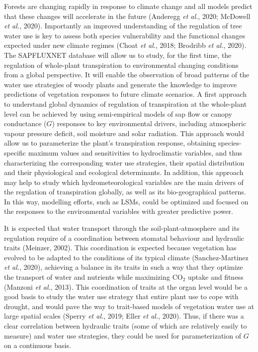 \documentclass[11pt,twoside]{reedthesis}
\begin{document}
Forests are changing rapidly in response to climate change and all
models predict that these changes will accelerate in the future
(Anderegg \emph{et al.}, 2020; McDowell \emph{et al.}, 2020).
Importantly an improved understanding of the regulation of tree water
use is key to assess both species vulnerability and the functional
changes expected under new climate regimes (Choat \emph{et al.}, 2018;
Brodribb \emph{et al.}, 2020). The SAPFLUXNET database will allow us to
study, for the first time, the regulation of whole-plant transpiration
to environmental changing conditions from a global perspective. It will
enable the observation of broad patterns of the water use strategies of
woody plants and generate the knowledge to improve predictions of
vegetation responses to future climate scenarios. A first approach to
understand global dynamics of regulation of transpiration at the
whole-plant level can be achieved by using semi-empirical models of sap
flow or canopy conductance (\(G\)) responses to key environmental
drivers, including atmospheric vapour pressure deficit, soil moisture
and solar radiation. This approach would allow us to parameterize the
plant's transpiration response, obtaining species-specific maximum
values and sensitivities to hydroclimatic variables, and thus
characterizing the corresponding water use strategies, their spatial
distribution and their physiological and ecological determinants. In
addition, this approach may help to study which hydrometeorological
variables are the main drivers of the regulation of transpiration
globally, as well as its bio-geographical patterns. In this way,
modelling efforts, such as LSMs, could be optimized and focused on the
responses to the environmental variables with greater predictive
power.\par

It is expected that water transport through the soil-plant-atmosphere
and its regulation require of a coordination between stomatal behaviour
and hydraulic traits (Meinzer, 2002). This coordination is expected
because vegetation has evolved to be adapted to the conditions of its
typical climate (Sanchez-Martinez \emph{et al.}, 2020), achieving a
balance in its traits in such a way that they optimize the transport of
water and nutrients while maximizing \(\text{CO}_2\) uptake and fitness
(Manzoni \emph{et al.}, 2013). This coordination of traits at the organ
level would be a good basis to study the water use strategy that entire
plant use to cope with drought, and would pave the way to trait-based
models of vegetation water use at large spatial scales (Sperry \emph{et
al.}, 2019; Eller \emph{et al.}, 2020). Thus, if there was a clear
correlation between hydraulic traits (some of which are relatively
easily to measure) and water use strategies, they could be used for
parameterization of \(G\) on a continuous basis.\par
\end{document}

